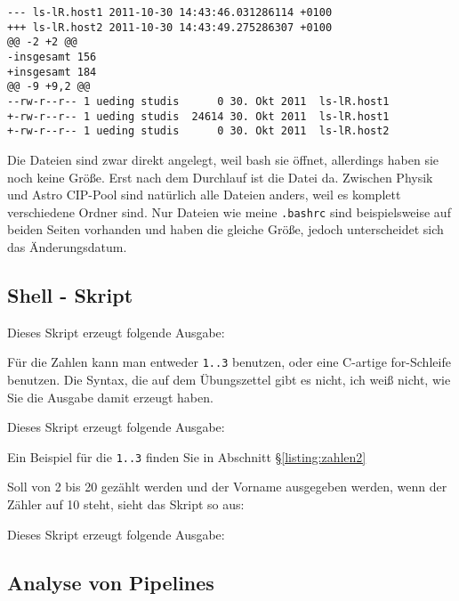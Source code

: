 \documentclass[10pt]{article}
\begin{document}
\begin{lstlisting}
--- ls-lR.host1 2011-10-30 14:43:46.031286114 +0100
+++ ls-lR.host2 2011-10-30 14:43:49.275286307 +0100
@@ -2 +2 @@
-insgesamt 156
+insgesamt 184
@@ -9 +9,2 @@
--rw-r--r-- 1 ueding studis      0 30. Okt 2011  ls-lR.host1
+-rw-r--r-- 1 ueding studis  24614 30. Okt 2011  ls-lR.host1
+-rw-r--r-- 1 ueding studis      0 30. Okt 2011  ls-lR.host2
\end{lstlisting}

Die Dateien sind zwar direkt angelegt, weil bash sie öffnet, allerdings haben sie noch keine Größe. Erst nach dem Durchlauf ist die Datei da. Zwischen Physik und Astro CIP-Pool sind natürlich alle Dateien anders, weil es komplett verschiedene Ordner sind. Nur Dateien wie meine \texttt{.bashrc} sind beispielsweise auf beiden Seiten vorhanden und haben die gleiche Größe, jedoch unterscheidet sich das Änderungsdatum.


\subsection{Shell - Skript}

\lstset{language=bash}


Dieses Skript erzeugt folgende Ausgabe:



Für die Zahlen kann man entweder \texttt{{1..3}} benutzen, oder eine C-artige for-Schleife benutzen. Die Syntax, die auf dem Übungszettel gibt es nicht, ich weiß nicht, wie Sie die Ausgabe damit erzeugt haben.

\lstset{language=bash}


Dieses Skript erzeugt folgende Ausgabe:



Ein Beispiel für die \texttt{{1..3}} finden Sie in Abschnitt §\ref{listing:zahlen2}

Soll von 2 bis 20 gezählt werden und der Vorname ausgegeben werden, wenn der Zähler auf 10 steht, sieht das Skript so aus:


\lstset{language=bash}


Dieses Skript erzeugt folgende Ausgabe:




\subsection{Analyse von Pipelines}
\end{document}

